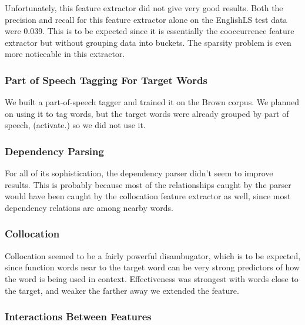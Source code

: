 \documentclass{article}
\begin{document}
Unfortunately, this feature extractor did not give very good results. Both the precision and recall for this feature extractor alone on the EnglishLS test data were 0.039. This is to be expected since it is essentially the cooccurrence feature extractor but without grouping data into buckets. The sparsity problem is even more noticeable in this extractor.

\subsubsection{Part of Speech Tagging For Target Words}
We built a part-of-speech tagger and trained it on the Brown corpus. We planned on using it to tag words, but the target words were already grouped by part of speech, (activate.) so we did not use it.


\subsubsection{Dependency Parsing}

For all of its sophistication, the dependency parser didn't seem to improve results.  This is probably because most of the relationships caught by the parser would have been caught by the collocation feature extractor as well, since most dependency relations are among nearby words.

\subsubsection{Collocation}

Collocation seemed to be a fairly powerful disambugator, which is to be expected, since function words near to the target word can be very strong predictors of how the word is being used in context.  Effectiveness was strongest with words close to the target, and weaker the farther away we extended the feature.

\subsubsection{Interactions Between Features}
\end{document}
